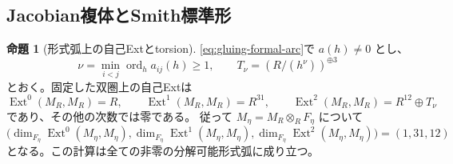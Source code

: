 \documentclass[a4paper,11pt]{ltjsarticle}
\theoremstyle{definition}
\newtheorem{theorem}{命題}[section]
\newcommand{\Ext}{\operatorname{Ext}}
\begin{document}
\subsection{Jacobian複体とSmith標準形}

\begin{theorem}[形式弧上の自己Extとtorsion]\label{thm:gluing-arc-ext}
\eqref{eq:gluing-formal-arc}で $a(h)\ne0$ とし、
\[
 \nu=\min_{i<j}\operatorname{ord}_h a_{ij}(h)\ge1,\qquad
 T_\nu=(R/(h^{\nu}))^{\oplus3}
\]
とおく。固定した双圏上の自己Extは
\begin{equation}\label{eq:gluing-arc-ext}
 \Ext^0(M_R,M_R)=R,\qquad
 \Ext^1(M_R,M_R)=R^{31},\qquad
 \Ext^2(M_R,M_R)=R^{12}\oplus T_\nu
\end{equation}
であり、その他の次数では零である。
従って $M_\eta=M_R\otimes_R F_\eta$ について
\[
 \bigl(\dim_{F_\eta}\Ext^0(M_\eta,M_\eta),
       \dim_{F_\eta}\Ext^1(M_\eta,M_\eta),
       \dim_{F_\eta}\Ext^2(M_\eta,M_\eta)\bigr)=(1,31,12)
\]
となる。この計算は全ての非零の分解可能形式弧に成り立つ。
\end{theorem}
\end{document}
